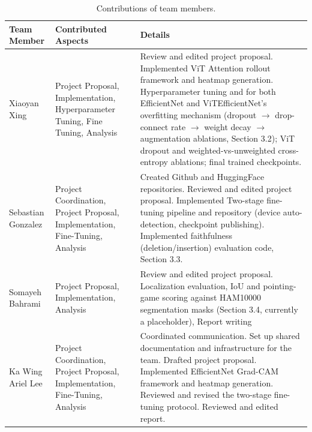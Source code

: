 \documentclass[10pt,twocolumn,letterpaper]{article}
\begin{document}
\begin{table}[t]
\begin{center}
\begin{tabular}{|p{3cm}|p{5cm}|p{8cm}|}
\hline
Team Member & Contributed Aspects & Details \\
\hline\hline
Xiaoyan Xing & Project Proposal, Implementation, Hyperparameter Tuning, Fine Tuning, Analysis & Review and edited project proposal. Implemented ViT Attention rollout framework and heatmap generation. Hyperparameter tuning and for both EfficientNet and ViTEfficientNet's overfitting mechanism (dropout $\rightarrow$ drop-connect rate $\rightarrow$ weight decay $\rightarrow$ augmentation ablations, Section 3.2); ViT dropout and weighted-vs-unweighted cross-entropy ablations; final trained checkpoints. \\
\hline
Sebastian Gonzalez & Project Coordination, Project Proposal, Implementation, Fine-Tuning, Analysis & Created Github and HuggingFace repositories. Reviewed and edited project proposal. Implemented Two-stage fine-tuning pipeline and repository (device auto-detection, checkpoint publishing). Implemented faithfulness (deletion/insertion) evaluation code, Section 3.3. \\
\hline
Somayeh Bahrami & Project Proposal, Implementation, Analysis & Review and edited project proposal. Localization evaluation, IoU and pointing-game scoring against HAM10000 segmentation masks (Section 3.4, currently a placeholder), Report writing \\
\hline
Ka Wing Ariel Lee & Project Coordination, Project Proposal, Implementation, Fine-Tuning, Analysis & Coordinated communication. Set up shared documentation and infrastructure for the team. Drafted project proposal. Implemented EfficientNet Grad-CAM framework and heatmap generation. Reviewed and revised the two-stage fine-tuning protocol. Reviewed and edited report.\\
\hline
\end{tabular}
\end{center}
\caption{Contributions of team members.}
\label{tab:contributions}
\end{table}


\end{document}
